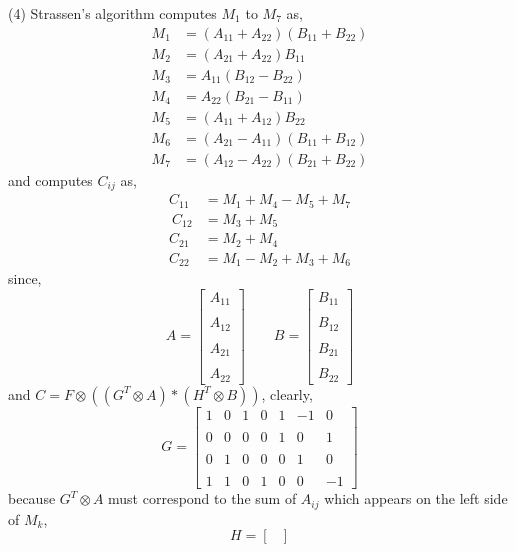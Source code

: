 \documentclass[11pt]{article}
\begin{document}
\begin{solution}
\item (4) Strassen's algorithm computes $M_1$ to $M_7$ as,
\begin{align*}
M_1 &= (A_{11} + A_{22})(B_{11} + B_{22})\\ 
M_2 &= (A_{21} + A_{22})B_{11}\\
M_3 &= A_{11}(B_{12} - B_{22})\\ 
M_4 &= A_{22}(B_{21} - B_{11})\\ 
M_5 &= (A_{11} + A_{12})B_{22}\\
M_6 &= (A_{21} - A_{11})(B_{11} + B_{12})\\ 
M_7 &= (A_{12} - A_{22})(B_{21} + B_{22})
\end{align*}
and computes $C_{ij}$ as,
\begin{align*}
C_{11} &= M_1 + M_4 - M_5 + M_7 \\ \
C_{12} &= M_3 + M_5 \\
C_{21} &= M_2 + M_4 \\
C_{22} &= M_1 - M_2 + M_3 + M_6
\end{align*}
since, 
\[ A = 
\begin{bmatrix}
    A_{11}  \\
\\
 A_{12} \\
\\
 A_{21}  \\
\\
 A_{22} 
\end{bmatrix}
\qquad
B = 
\begin{bmatrix}
    B_{11}  \\
\\
 B_{12} \\
\\
 B_{21}  \\
\\
 B_{22} 
\end{bmatrix}
\]
and $C = F \otimes ((G^T \otimes A) * (H^T \otimes B))$,
clearly,
\[
G = 
\begin{bmatrix}
  1 & 0 & 1 &0 & 1& -1& 0\\
\\
 0 & 0 & 0& 0& 1& 0& 1\\
\\
 0  & 1 & 0& 0& 0& 1& 0\\
\\
 1 & 1 & 0& 1& 0& 0& -1
\end{bmatrix}
\]
because $G^T \otimes A$ must correspond to the sum of $A_{ij}$ which appears on the left side of $M_{k}$,
\[
H = 
\begin{bmatrix}

\end{bmatrix}\]
\end{solution}
\end{document}

